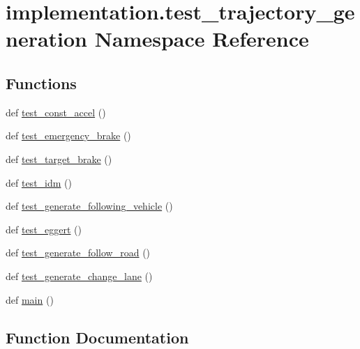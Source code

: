 \hypertarget{namespaceimplementation_1_1test__trajectory__generation}{}\section{implementation.\+test\+\_\+trajectory\+\_\+generation Namespace Reference}
\label{namespaceimplementation_1_1test__trajectory__generation}
\subsection*{Functions}
\begin{DoxyCompactItemize}
\item 
def \hyperlink{namespaceimplementation_1_1test__trajectory__generation_aa2aecd2bd5631602c89c0c4e6b4d07ff}{test\+\_\+const\+\_\+accel} ()
\item 
def \hyperlink{namespaceimplementation_1_1test__trajectory__generation_aa0a22ffcadc7868176c93d625a05d8d6}{test\+\_\+emergency\+\_\+brake} ()
\item 
def \hyperlink{namespaceimplementation_1_1test__trajectory__generation_a4990c1c06bc0e12fad92b3aa0246369b}{test\+\_\+target\+\_\+brake} ()
\item 
def \hyperlink{namespaceimplementation_1_1test__trajectory__generation_a999c1fc1b48b33ef8ab64248107003b1}{test\+\_\+idm} ()
\item 
def \hyperlink{namespaceimplementation_1_1test__trajectory__generation_a7654d4549a5b8793abc6ba32039a5eb0}{test\+\_\+generate\+\_\+following\+\_\+vehicle} ()
\item 
def \hyperlink{namespaceimplementation_1_1test__trajectory__generation_a4537594584ca0aab55feaef49107640a}{test\+\_\+eggert} ()
\item 
def \hyperlink{namespaceimplementation_1_1test__trajectory__generation_a66ba40cf7cc0f6b2f88dad19b5152672}{test\+\_\+generate\+\_\+follow\+\_\+road} ()
\item 
def \hyperlink{namespaceimplementation_1_1test__trajectory__generation_a96f6dd61579f3d7daed5040006d28967}{test\+\_\+generate\+\_\+change\+\_\+lane} ()
\item 
def \hyperlink{namespaceimplementation_1_1test__trajectory__generation_af02439a0a1d2faceabd1179a74a10752}{main} ()
\end{DoxyCompactItemize}


\subsection{Function Documentation}
\mbox{\label{namespaceimplementation_1_1test__trajectory__generation_af02439a0a1d2faceabd1179a74a10752}} 
